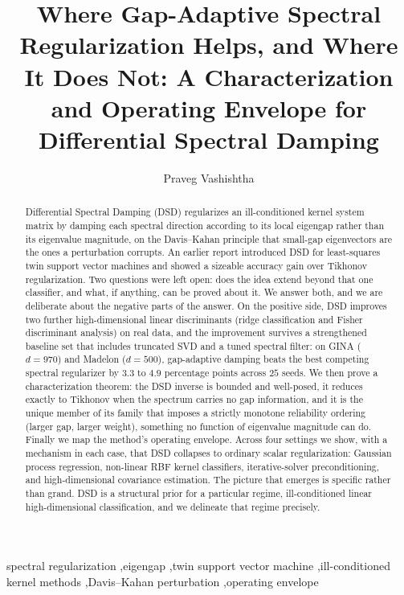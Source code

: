 \documentclass[preprint,12pt]{elsarticle}
\begin{document}
\begin{frontmatter}

\title{Where Gap-Adaptive Spectral Regularization Helps, and Where It Does Not:
A Characterization and Operating Envelope for Differential Spectral Damping}

\author[iitp,sbs]{Praveg Vashishtha}
\address[iitp]{Department of Computer Science and Engineering, Indian Institute of Technology Patna, India}
\address[sbs]{Sopra Banking Software India}

\begin{abstract}
Differential Spectral Damping (DSD) regularizes an ill-conditioned kernel system matrix by damping
each spectral direction according to its local eigengap rather than its eigenvalue magnitude, on the
Davis--Kahan principle that small-gap eigenvectors are the ones a perturbation corrupts. An earlier
report introduced DSD for least-squares twin support vector machines and showed a sizeable accuracy
gain over Tikhonov regularization. Two questions were left open: does the idea extend beyond that one
classifier, and what, if anything, can be proved about it. We answer both, and we are deliberate about
the negative parts of the answer. On the positive side, DSD improves two further high-dimensional
linear discriminants (ridge classification and Fisher discriminant analysis) on real data, and the
improvement survives a strengthened baseline set that includes truncated SVD and a tuned spectral
filter: on GINA ($d=970$) and Madelon ($d=500$), gap-adaptive damping beats the best competing
spectral regularizer by $3.3$ to $4.9$ percentage points across $25$ seeds. We then prove a
characterization theorem: the DSD inverse is bounded and well-posed, it reduces exactly to Tikhonov
when the spectrum carries no gap information, and it is the unique member of its family that imposes a
strictly monotone reliability ordering (larger gap, larger weight), something no function of
eigenvalue magnitude can do. Finally we map the method's operating envelope. Across four settings we
show, with a mechanism in each case, that DSD collapses to ordinary scalar regularization: Gaussian
process regression, non-linear RBF kernel classifiers, iterative-solver preconditioning, and
high-dimensional covariance estimation. The picture that emerges is specific rather than grand. DSD is
a structural prior for a particular regime, ill-conditioned linear high-dimensional classification,
and we delineate that regime precisely.
\end{abstract}

\begin{keyword}
spectral regularization \sep eigengap \sep twin support vector machine \sep ill-conditioned kernel
methods \sep Davis--Kahan perturbation \sep operating envelope
\end{keyword}

\end{frontmatter}
\end{document}
